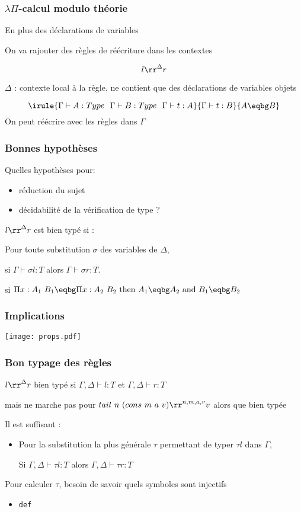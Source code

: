 \documentclass[12pt,aspectratio=169]{beamer}
\begin{document}
\begin{frame}
  \frametitle{$\lambda\Pi$-calcul modulo théorie}
  En plus des déclarations de variables

  On va rajouter des règles de réécriture dans les contextes

  $$l\rr^\Delta r$$
  
  $\Delta$ : contexte local à la règle, ne contient que des
  déclarations de variables objets
  \bigskip

  $$\irule{\Gamma \vdash A:Type~~\Gamma \vdash B:Type~~\Gamma \vdash t:A}
        {\Gamma \vdash t:B}
        {A \eqbg B}$$
On peut réécrire avec les règles dans $\Gamma$
\end{frame}

\begin{frame}
  \frametitle{Bonnes hypothèses}
  Quelles hypothèses pour:
  \begin{itemize}
  \item réduction du sujet
  \item décidabilité de la vérification de type ?
  \end{itemize}
  \bigskip

  \begin{definition}
    $l\rr^\Delta r$ est bien typé si :
    
    Pour toute substitution
    $\sigma$ des variables de $\Delta$,

    si $\Gamma\vdash \sigma l:T$ alors $\Gamma\vdash \sigma r:T$.
  \end{definition}

  \begin{definition}
    si $\Pi x:A_1~B_1 \eqbg \Pi x:A_2~B_2 \mbox{ then } A_1 \eqbg
A_2~\text{and}~B_1 \eqbg B_2$
  \end{definition}

\end{frame}

\begin{frame}
  \frametitle{Implications}
  \texttt{[image: props.pdf]}
\end{frame}

\begin{frame}[fragile]
  \frametitle{Bon typage des règles}
$l\rr^\Delta r$ bien typé si $\Gamma,\Delta\vdash l : T$ et
  $\Gamma,\Delta \vdash r : T$
\medskip
  
  mais ne marche pas pour
  $tail~n~(cons~m~a~v)\rr^{n,m,a,v}v$ alors que bien typée
  \medskip
  
  Il est suffisant :
  \begin{itemize}
  \item Pour la substitution la plus générale $\tau$ permettant de typer
    $\tau l$ dans $\Gamma$,

    Si $\Gamma,\Delta\vdash \tau l:T$ alors $\Gamma,\Delta\vdash \tau
    r : T$
  \end{itemize}
  Pour calculer $\tau$, besoin de savoir quels symboles sont injectifs
  \begin{itemize}
  \item \lstinline!def!
  \end{itemize}
\end{frame}
\end{document}
